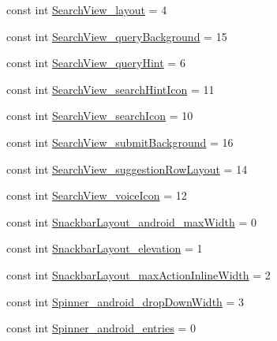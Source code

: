 \begin{DoxyCompactItemize}
\item 
const int \mbox{\hyperlink{class_f_w_p_s___app_1_1_droid_1_1_resource_1_1_styleable_a74d44db16a9a115b4a868b297ad7769b}{Search\+View\+\_\+layout}} = 4
\item 
const int \mbox{\hyperlink{class_f_w_p_s___app_1_1_droid_1_1_resource_1_1_styleable_a5a6d81841dccda8ecd6221088e0b700c}{Search\+View\+\_\+query\+Background}} = 15
\item 
const int \mbox{\hyperlink{class_f_w_p_s___app_1_1_droid_1_1_resource_1_1_styleable_a5d7493d3a15f3e337eb7d517b8244fc7}{Search\+View\+\_\+query\+Hint}} = 6
\item 
const int \mbox{\hyperlink{class_f_w_p_s___app_1_1_droid_1_1_resource_1_1_styleable_a41933da096d9833bbfa9ab52c403a7ce}{Search\+View\+\_\+search\+Hint\+Icon}} = 11
\item 
const int \mbox{\hyperlink{class_f_w_p_s___app_1_1_droid_1_1_resource_1_1_styleable_a2f22543bcae5c9f3dd8accf80363e736}{Search\+View\+\_\+search\+Icon}} = 10
\item 
const int \mbox{\hyperlink{class_f_w_p_s___app_1_1_droid_1_1_resource_1_1_styleable_aea1f8b449c9b672adb00c58cfb8b7cd4}{Search\+View\+\_\+submit\+Background}} = 16
\item 
const int \mbox{\hyperlink{class_f_w_p_s___app_1_1_droid_1_1_resource_1_1_styleable_a68d2310e08809b343ae1fb92452bdf4b}{Search\+View\+\_\+suggestion\+Row\+Layout}} = 14
\item 
const int \mbox{\hyperlink{class_f_w_p_s___app_1_1_droid_1_1_resource_1_1_styleable_ae63bf5d07b948a4f19014bfb6b45600c}{Search\+View\+\_\+voice\+Icon}} = 12
\item 
const int \mbox{\hyperlink{class_f_w_p_s___app_1_1_droid_1_1_resource_1_1_styleable_afa3a8e8097ca319bed40643acdd63a78}{Snackbar\+Layout\+\_\+android\+\_\+max\+Width}} = 0
\item 
const int \mbox{\hyperlink{class_f_w_p_s___app_1_1_droid_1_1_resource_1_1_styleable_ab143e0ffb4b156878efcf6b2bb2c6274}{Snackbar\+Layout\+\_\+elevation}} = 1
\item 
const int \mbox{\hyperlink{class_f_w_p_s___app_1_1_droid_1_1_resource_1_1_styleable_a2405eb67781edf7accdba6bd4ec94123}{Snackbar\+Layout\+\_\+max\+Action\+Inline\+Width}} = 2
\item 
const int \mbox{\hyperlink{class_f_w_p_s___app_1_1_droid_1_1_resource_1_1_styleable_a53f4998b33fbecd0722ef8c720929c97}{Spinner\+\_\+android\+\_\+drop\+Down\+Width}} = 3
\item 
const int \mbox{\hyperlink{class_f_w_p_s___app_1_1_droid_1_1_resource_1_1_styleable_a958ea22a5f89efeb3d580ffda2fa7960}{Spinner\+\_\+android\+\_\+entries}} = 0

\end{DoxyCompactItemize}
